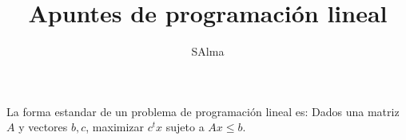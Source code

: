 \documentclass{article}
\title{Apuntes de programación lineal}
\author{SAlma}
\begin{document}
\maketitle

La forma estandar de un problema de programación lineal es:
Dados una matriz $A$ y vectores $b,c$, maximizar $c^tx$ sujeto a $Ax\leq b$.
\end{document}
